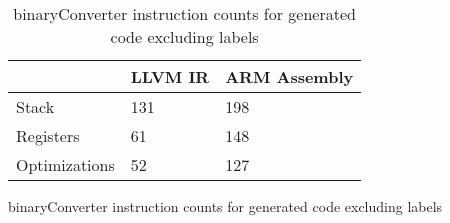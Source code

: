 \begin{table}[h!]
\centering
\begin{tabular}{p{}p{}p{}}
  \hline
 & LLVM IR & ARM Assembly \\ 
  \hline
Stack & 131 & 198 \\ 
  Registers &  61 & 148 \\ 
  Optimizations &  52 & 127 \\ 
   \hline
\end{tabular}
\caption{binaryConverter instruction counts for generated code excluding labels}
\caption{binaryConverter instruction counts for generated code excluding labels}
\end{table}
